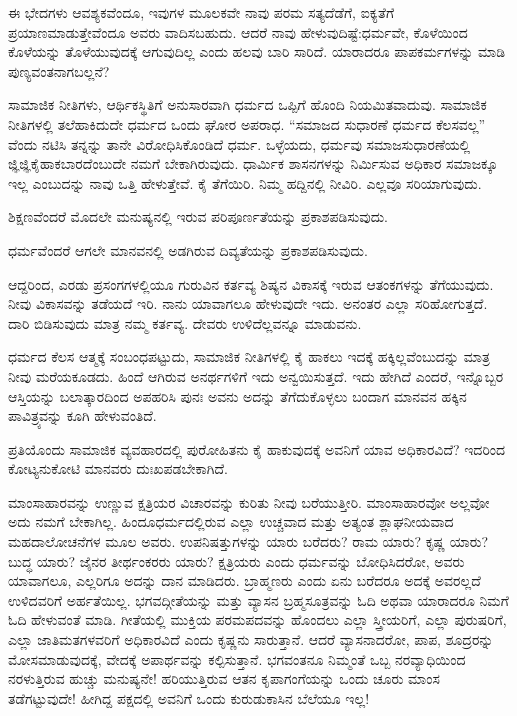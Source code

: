 ಈ ಭೇದಗಳು ಆವಶ್ಯಕವೆಂದೂ, ಇವುಗಳ ಮೂಲಕವೇ ನಾವು ಪರಮ ಸತ್ಯದೆಡೆಗೆ, ಐಕ್ಯತೆಗೆ ಪ್ರಯಾಣಮಾಡುತ್ತೇವೆಂದೂ ಅವರು ವಾದಿಸಬಹುದು. ಆದರೆ ನಾವು ಹೇಳುವುದಿಷ್ಟೆ:ಧರ್ಮವೇ, ಕೊಳೆಯಿಂದ ಕೊಳೆಯನ್ನು ತೊಳೆಯುವುದಕ್ಕೆ ಆಗುವುದಿಲ್ಲ ಎಂದು ಹಲವು ಬಾರಿ ಸಾರಿದೆ. ಯಾರಾದರೂ ಪಾಪಕರ್ಮಗಳನ್ನು ಮಾಡಿ ಪುಣ್ಯವಂತನಾಗಬಲ್ಲನೆ?

\vspace{0.2cm}

ಸಾಮಾಜಿಕ ನೀತಿಗಳು, ಆರ್ಥಿಕಸ್ಥಿತಿಗೆ ಅನುಸಾರವಾಗಿ ಧರ್ಮದ ಒಪ್ಪಿಗೆ ಹೊಂದಿ ನಿಯಮಿತವಾದುವು. ಸಾಮಾಜಿಕ ನೀತಿಗಳಲ್ಲಿ ತಲೆಹಾಕಿದುದೇ ಧರ್ಮದ ಒಂದು ಘೋರ ಅಪರಾಧ. ``ಸಮಾಜದ ಸುಧಾರಣೆ ಧರ್ಮದ ಕೆಲಸವಲ್ಲ'' ವೆಂದು ನಟಿಸಿ ತನ್ನನ್ನು ತಾನೇ ವಿರೋಧಿಸಿಕೊಂಡಿದೆ ಧರ್ಮ. ಒಳ್ಳೆಯದು, ಧರ್ಮವು ಸಮಾಜಸುಧಾರಣೆಯಲ್ಲಿ ಜ್ಞಿಜ್ಞಿಕೈಹಾಕಬಾರದೆಂಬುದೇ ನಮಗೆ ಬೇಕಾಗಿರುವುದು. ಧಾರ್ಮಿಕ ಶಾಸನಗಳನ್ನು ನಿರ್ಮಿಸುವ ಅಧಿಕಾರ ಸಮಾಜಕ್ಕೂ ಇಲ್ಲ ಎಂಬುದನ್ನು ನಾವು ಒತ್ತಿ ಹೇಳುತ್ತೇವೆ. ಕೈ ತೆಗೆಯಿರಿ. ನಿಮ್ಮ ಹದ್ದಿನಲ್ಲಿ ನೀವಿರಿ. ಎಲ್ಲವೂ ಸರಿಯಾಗುವುದು.

\vspace{0.2cm}

ಶಿಕ್ಷಣವೆಂದರೆ ಮೊದಲೇ ಮನುಷ್ಯನಲ್ಲಿ ಇರುವ ಪರಿಪೂರ್ಣತೆಯನ್ನು ಪ್ರಕಾಶಪಡಿಸುವುದು.

\vspace{0.2cm}

ಧರ್ಮವೆಂದರೆ ಆಗಲೇ ಮಾನವನಲ್ಲಿ ಅಡಗಿರುವ ದಿವ್ಯತೆಯನ್ನು ಪ್ರಕಾಶಪಡಿಸುವುದು.

\vspace{0.2cm}

ಆದ್ದರಿಂದ, ಎರಡು ಪ್ರಸಂಗಗಳಲ್ಲಿಯೂ ಗುರುವಿನ ಕರ್ತವ್ಯ ಶಿಷ್ಯನ ವಿಕಾಸಕ್ಕೆ ಇರುವ ಆತಂಕಗಳನ್ನು ತೆಗೆಯುವುದು. ನೀವು ವಿಕಾಸವನ್ನು ತಡೆಯದೆ ಇರಿ. ನಾನು ಯಾವಾಗಲೂ ಹೇಳುವುದೇ ಇದು. ಅನಂತರ ಎಲ್ಲಾ ಸರಿಹೋಗುತ್ತದೆ. ದಾರಿ ಬಿಡಿಸುವುದು ಮಾತ್ರ ನಮ್ಮ ಕರ್ತವ್ಯ. ದೇವರು ಉಳಿದೆಲ್ಲವನ್ನೂ ಮಾಡುವನು.

\vspace{0.2cm}

ಧರ್ಮದ ಕೆಲಸ ಆತ್ಮಕ್ಕೆ ಸಂಬಂಧಪಟ್ಟುದು, ಸಾಮಾಜಿಕ ನೀತಿಗಳಲ್ಲಿ ಕೈ ಹಾಕಲು ಇದಕ್ಕೆ ಹಕ್ಕಿಲ್ಲವೆಂಬುದನ್ನು ಮಾತ್ರ ನೀವು ಮರೆಯಕೂಡದು. ಹಿಂದೆ ಆಗಿರುವ ಅನರ್ಥಗಳಿಗೆ ಇದು ಅನ್ವಯಿಸುತ್ತದೆ. ಇದು ಹೇಗಿದೆ ಎಂದರೆ, ಇನ್ನೊಬ್ಬರ ಆಸ್ತಿಯನ್ನು ಬಲಾತ್ಕಾರದಿಂದ ಅಪಹರಿಸಿ ಪುನಃ ಅವನು ಅದನ್ನು ತೆಗೆದುಕೊಳ್ಳಲು ಬಂದಾಗ ಮಾನವನ ಹಕ್ಕಿನ ಪಾವಿತ್ರ್ಯವನ್ನು ಕೂಗಿ ಹೇಳುವಂತಿದೆ.

\vspace{0.2cm}

ಪ್ರತಿಯೊಂದು ಸಾಮಾಜಿಕ ವ್ಯವಹಾರದಲ್ಲಿ ಪುರೋಹಿತನು ಕೈ ಹಾಕುವುದಕ್ಕೆ ಅವನಿಗೆ ಯಾವ ಅಧಿಕಾರವಿದೆ? ಇದರಿಂದ ಕೋಟ್ಯನುಕೋಟಿ ಮಾನವರು ದುಃಖಪಡಬೇಕಾಗಿದೆ.

\vspace{0.2cm}
ಮಾಂಸಾಹಾರವನ್ನು ಉಣ್ಣುವ ಕ್ಷತ್ರಿಯರ ವಿಚಾರವನ್ನು ಕುರಿತು ನೀವು ಬರೆಯುತ್ತೀರಿ. ಮಾಂಸಾಹಾರವೋ ಅಲ್ಲವೋ ಅದು ನಮಗೆ ಬೇಕಾಗಿಲ್ಲ. ಹಿಂದೂಧರ್ಮದಲ್ಲಿರುವ ಎಲ್ಲಾ ಉಚ್ಚವಾದ ಮತ್ತು ಅತ್ಯಂತ ಶ್ಲಾಘನೀಯವಾದ ಮಹದಾಲೋಚನೆಗಳ ಮೂಲ ಅವರು. ಉಪನಿಷತ್ತುಗಳನ್ನು ಯಾರು ಬರೆದರು? ರಾಮ ಯಾರು? ಕೃಷ್ಣ ಯಾರು? ಬುದ್ಧ ಯಾರು? ಜೈನರ ತೀರ್ಥಂಕರರು ಯಾರು? ಕ್ಷತ್ರಿಯರು ಎಂದು ಧರ್ಮವನ್ನು ಬೋಧಿಸಿದರೋ, ಅವರು ಯಾವಾಗಲೂ, ಎಲ್ಲರಿಗೂ ಅದನ್ನು ದಾನ ಮಾಡಿದರು. ಬ್ರಾಹ್ಮಣರು ಎಂದು ಏನು ಬರೆದರೂ ಅದಕ್ಕೆ ಅವರಲ್ಲದೆ ಉಳಿದವರಿಗೆ ಅರ್ಹತೆಯಿಲ್ಲ. ಭಗವದ್ಗೀತೆಯನ್ನು ಮತ್ತು ವ್ಯಾಸನ ಬ್ರಹ್ಮಸೂತ್ರವನ್ನು ಓದಿ ಅಥವಾ ಯಾರಾದರೂ ನಿಮಗೆ ಓದಿ ಹೇಳುವಂತೆ ಮಾಡಿ. ಗೀತೆಯಲ್ಲಿ ಮುಕ್ತಿಯ ಪರಮಪದವನ್ನು ಹೊಂದಲು ಎಲ್ಲಾ ಸ್ತ್ರೀಯರಿಗೆ, ಎಲ್ಲಾ ಪುರುಷರಿಗೆ, ಎಲ್ಲಾ ಜಾತಿಮತಗಳವರಿಗೆ ಅಧಿಕಾರವಿದೆ ಎಂದು ಕೃಷ್ಣನು ಸಾರುತ್ತಾನೆ. ಆದರೆ ವ್ಯಾಸನಾದರೋ, ಪಾಪ, ಶೂದ್ರರನ್ನು ಮೋಸಮಾಡುವುದಕ್ಕೆ, ವೇದಕ್ಕೆ ಅಪಾರ್ಥವನ್ನು ಕಲ್ಪಿಸುತ್ತಾನೆ. ಭಗವಂತನೂ ನಿಮ್ಮಂತೆ ಒಬ್ಬ ನರವ್ಯಾಧಿಯಿಂದ ನರಳುತ್ತಿರುವ ಹುಚ್ಚು ಮನುಷ್ಯನೇ! ಹರಿಯುತ್ತಿರುವ ಆತನ ಕೃಪಾಗಂಗೆಯನ್ನು ಒಂದು ಚೂರು ಮಾಂಸ ತಡೆಗಟ್ಟುವುದೇ! ಹೀಗಿದ್ದ ಪಕ್ಷದಲ್ಲಿ ಅವನಿಗೆ ಒಂದು ಕುರುಡುಕಾಸಿನ ಬೆಲೆಯೂ ಇಲ್ಲ!

